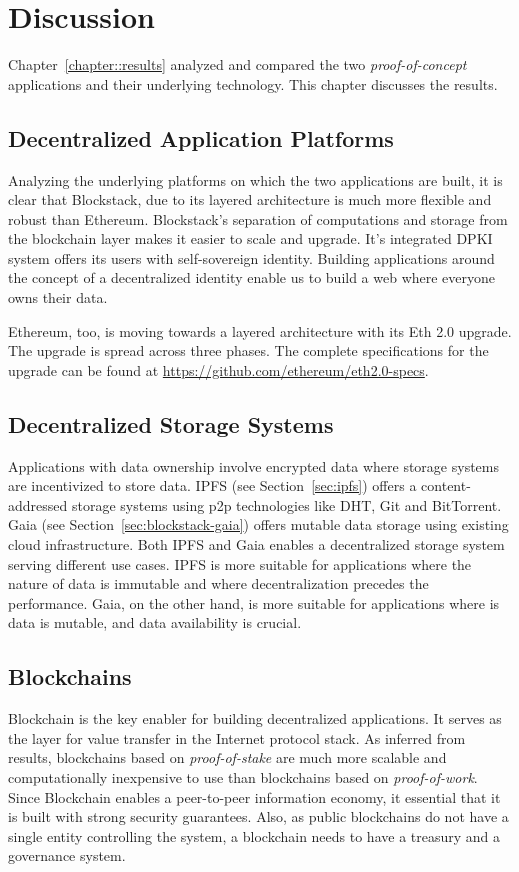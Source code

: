 \chapter{Discussion}\label{chapter::discussion}

	Chapter~\ref{chapter::results} analyzed and compared the two \textit{proof-of-concept} applications and their underlying technology. This chapter discusses the results.
	
	\section{Decentralized Application Platforms}
	Analyzing the underlying platforms on which the two applications are built, it is clear that Blockstack, due to its layered architecture is much more flexible and robust than Ethereum. Blockstack's separation of computations and storage from the blockchain layer makes it easier to scale and upgrade. It's integrated DPKI system offers its users with self-sovereign identity. Building applications around the concept of a decentralized identity enable us to build a web where everyone owns their data.
	
	Ethereum, too, is moving towards a layered architecture with its Eth 2.0 upgrade. The upgrade is spread across three phases. The complete specifications for the upgrade can be found at \url{https://github.com/ethereum/eth2.0-specs}.
	
	\section{Decentralized Storage Systems}
	Applications with data ownership involve encrypted data where storage systems are incentivized to store data. IPFS (see Section~\ref{sec:ipfs}) offers a content-addressed storage systems using p2p technologies like DHT, Git and BitTorrent. Gaia (see Section~\ref{sec:blockstack-gaia}) offers mutable data storage using existing cloud infrastructure. Both IPFS and Gaia enables a decentralized storage system serving different use cases. IPFS is more suitable for applications where the nature of data is immutable and where decentralization precedes the performance. Gaia, on the other hand, is more suitable for applications where is data is mutable, and data availability is crucial.
	
	\section{Blockchains}
	Blockchain is the key enabler for building decentralized applications. It serves as the layer for value transfer in the Internet protocol stack. As inferred from results, blockchains based on \textit{proof-of-stake} are much more scalable and computationally inexpensive to use than blockchains based on \textit{proof-of-work}. Since Blockchain enables a peer-to-peer information economy, it essential that it is built with strong security guarantees. Also, as public blockchains do not have a single entity controlling the system, a blockchain needs to have a treasury and a governance system.
	